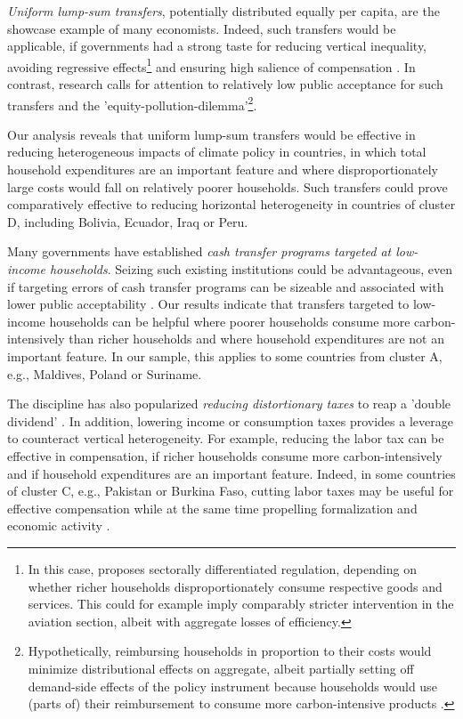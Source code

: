 \documentclass[12pt, a4paper]{article}
\begin{document}
\textit{Uniform lump-sum transfers}, potentially distributed equally per capita, are the showcase example of many economists. Indeed, such transfers would be applicable, if governments had a strong taste for reducing vertical inequality, avoiding regressive effects\footnote{In this case, \textcite{Stiglitz.2019} proposes sectorally differentiated regulation, depending on whether richer households disproportionately consume respective goods and services. This could for example imply comparably stricter intervention in the aviation section, albeit with aggregate losses of efficiency.} and ensuring high salience of compensation \autocite{Chetty.2009}. In contrast, research calls for attention to relatively low public acceptance for such transfers and the 'equity-pollution-dilemma'\footnote{Hypothetically, reimbursing households in proportion to their costs would minimize distributional effects on aggregate, albeit partially setting off demand-side effects of the policy instrument because households would use (parts of) their reimbursement to consume more carbon-intensive products \autocite[see also][]{Stiglitz.2019}.}\autocite{Sager.2019}.

Our analysis reveals that uniform lump-sum transfers would be effective in reducing heterogeneous impacts of climate policy in countries, in which total household expenditures are an important feature and where disproportionately large costs would fall on relatively poorer households. Such transfers could prove comparatively effective to reducing horizontal heterogeneity in countries of cluster D, including Bolivia, Ecuador, Iraq or Peru. %

Many governments have established \textit{cash transfer programs targeted at low-income households}. Seizing such existing institutions could be advantageous, even if targeting errors of cash transfer programs can be sizeable \autocite{Banerjee.2022} and associated with lower public acceptability \autocite{Bah.2019}. Our results indicate that transfers targeted to low-income households can be helpful where poorer households consume more carbon-intensively than richer households and where household expenditures are not an important feature. In our sample, this applies to some countries from cluster A, e.g., Maldives, Poland or Suriname.

The discipline has also popularized \textit{reducing distortionary taxes} to reap a 'double dividend' \autocite{Bovenberg.1996}. In addition, lowering income or consumption taxes provides a leverage to counteract vertical heterogeneity. For example, reducing the labor tax can be effective in compensation, if richer households consume more carbon-intensively and if household expenditures are an important feature. Indeed, in some countries of cluster C, e.g., Pakistan or Burkina Faso, cutting labor taxes may be useful for effective compensation while at the same time propelling formalization \autocite{Jessen.2021,Rocha.2018} and economic activity \autocite{Ulyssea.2018}.
\end{document}
